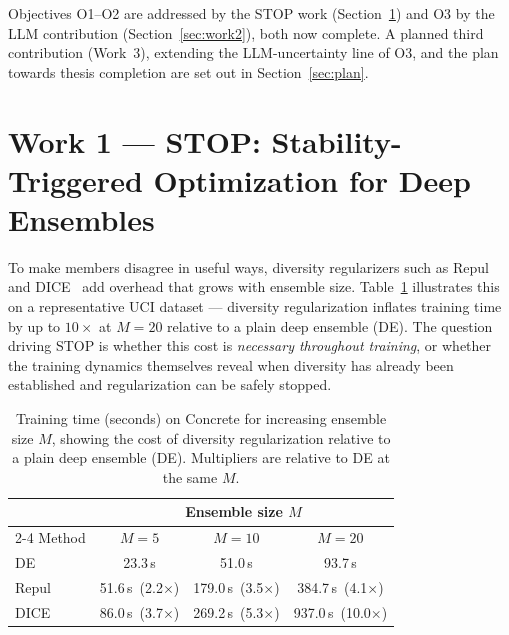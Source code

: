 \documentclass[11pt]{article}
\begin{document}
Objectives O1--O2 are addressed by the STOP work (Section~\ref{sec:work1}) and O3 by the LLM
contribution (Section~\ref{sec:work2}), both now complete. A planned third contribution (Work~3),
extending the LLM-uncertainty line of O3, and the plan towards thesis completion are set out in
Section~\ref{sec:plan}.


\section{Work 1 --- STOP: Stability-Triggered Optimization for Deep Ensembles}
\label{sec:work1}

To make members disagree in useful ways, diversity regularizers such as
Repul~\cite{dangelo2021repulsive} and DICE~\cite{rame2021dice} add overhead that grows with
ensemble size. Table~\ref{tab:cost} illustrates this on a representative UCI dataset --- diversity
regularization inflates training time by up to $10\times$ at $M=20$ relative to a plain deep
ensemble (DE). The question driving STOP is whether this cost is \emph{necessary throughout
training}, or whether the training dynamics themselves reveal when diversity has already been
established and regularization can be safely stopped.

\begin{table}[ht]
  \centering
  \caption{Training time (seconds) on Concrete for increasing ensemble size $M$, showing the
  cost of diversity regularization relative to a plain deep ensemble (DE). Multipliers are
  relative to DE at the same $M$.}
  \label{tab:cost}
  \begin{tabular}{lccc}
    \toprule
    & \multicolumn{3}{c}{Ensemble size $M$} \\
    \cmidrule(lr){2-4}
    Method & $M=5$ & $M=10$ & $M=20$ \\
    \midrule
    DE    &  23.3\,s          &  51.0\,s          &   93.7\,s \\
    Repul &  51.6\,s\ (2.2$\times$) & 179.0\,s\ (3.5$\times$) & 384.7\,s\ (4.1$\times$) \\
    DICE  &  86.0\,s\ (3.7$\times$) & 269.2\,s\ (5.3$\times$) & 937.0\,s\ (10.0$\times$) \\
    \bottomrule
  \end{tabular}
\end{table}
\end{document}
